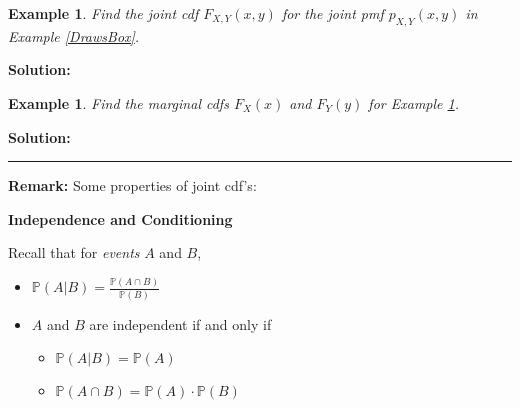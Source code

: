 \documentclass[12pt]{amsart}
\newtheorem{example}[theorem]{Example}
\begin{document}
{%
\begin{example}\label{DrawsBoxCDF}
Find the joint cdf $F_{X,Y}(x,y)$ for the joint pmf $p_{X,Y}(x,y)$ in Example \ref{DrawsBox}.

\end{example}

\textbf{Solution:}




\newpage
\begin{example}
Find the marginal cdfs $F_{X}(x)$ and $F_{Y}(y)$ for Example \ref{DrawsBoxCDF}.

\end{example}

\textbf{Solution:}



\vspace{14cm}
\hrule
\vspace{.5cm}

\textbf{Remark:} Some properties of joint cdf's:%






\newpage

\textbf{Independence and Conditioning}
\vspace{.5cm}

Recall that for \textit{events} $A$ and $B$,
\begin{itemize}
\item $\mathbb{P}(A|B) = \frac{\mathbb{P}(A \cap B)}{\mathbb{P}(B)}$
\item $A$ and $B$ are independent if and only if 
	\begin{itemize}
	\item $\mathbb{P}(A|B) = \mathbb{P}(A)$ 
	\item$\mathbb{P}(A \cap B) = \mathbb{P}(A)\cdot\mathbb{P}(B)$
	\end{itemize}
\end{itemize}

}
\end{document}
